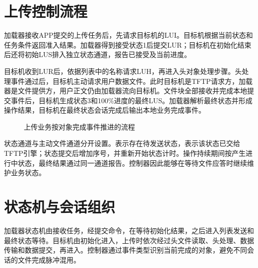 \section{上传控制流程}
加载器接收APP提交的上传任务后，先请求目标机的LUI。目标机根据当前状态和任务条件返回准入结果。加载器得到接受状态1后提交LUR；目标机在初始化结束后还将初始LUS排入独立状态通道，报告已接受及当前进度。

目标机收到LUR后，依据列表中的名称请求LUH，再进入头对象处理步骤。头处理事件通过后，目标机主动请求用户数据文件。此时目标机是TFTP请求方，加载器是文件提供方，用户正文仍由加载器流向目标机。文件块全部接收并完成本地提交事件后，目标机生成状态3和100\%进度的最终LUS。加载器解析最终状态并形成操作结果，目标机在最终状态会话完成后输出本地业务完成事件。

\begin{figure}[htbp]\centering
{}
\caption{上传业务按对象完成事件推进的流程}
\end{figure}

状态通道与主动文件通道分开设置。表示存在待发送状态，表示该状态已交给TFTP引擎；状态提交后增加序号，并重新开始状态计时。操作持续期间按产生进行中状态，最终结果通过同一通道报告。控制器因此能够在等待文件应答时继续维护业务状态。

\section{状态机与会话组织}
加载器状态机由接收任务，经提交命令，在等待初始化结果，之后进入列表发送和最终状态等待。目标机由初始化进入，上传时依次经过头文件读取、头处理、数据传输和数据提交，再进入。控制器通过事件类型识别当前完成的对象，避免不同会话的文件完成脉冲混用。

